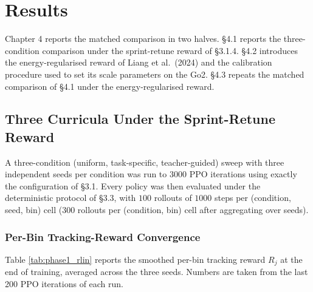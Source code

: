 \section{Results}

Chapter 4 reports the matched comparison in two halves. \S4.1 reports the three-condition comparison under the sprint-retune reward of \S3.1.4. \S4.2 introduces the energy-regularised reward of Liang et al.\ (2024) and the calibration procedure used to set its scale parameters on the Go2. \S4.3 repeats the matched comparison of \S4.1 under the energy-regularised reward.

\subsection{Three Curricula Under the Sprint-Retune Reward}

A three-condition (uniform, task-specific, teacher-guided) sweep with three independent seeds per condition was run to $3000$ PPO iterations using exactly the configuration of \S3.1. Every policy was then evaluated under the deterministic protocol of \S3.3, with $100$ rollouts of $1000$ steps per (condition, seed, bin) cell ($300$ rollouts per (condition, bin) cell after aggregating over seeds).

\subsubsection{Per-Bin Tracking-Reward Convergence}

Table \ref{tab:phase1_rlin} reports the smoothed per-bin tracking reward $R_j$ at the end of training, averaged across the three seeds. Numbers are taken from the last 200 PPO iterations of each run.

